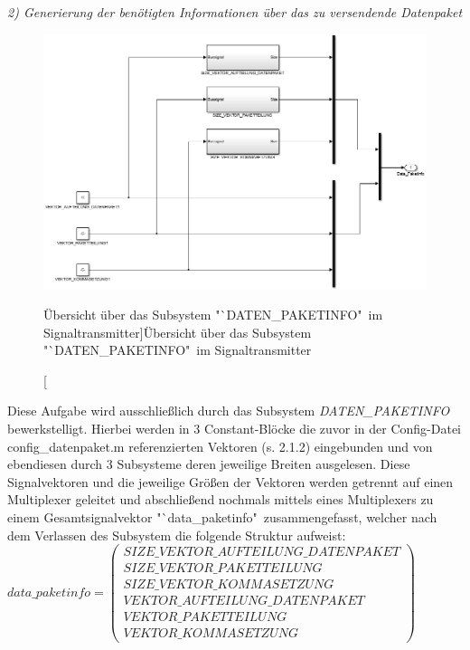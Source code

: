\documentclass[fontsize = 12pt, paper = a4]{scrreprt}
\begin{document}

\textit{2) Generierung der benötigten Informationen über das zu versendende Datenpaket} \\

\begin{figure}[h]
\centering
\includegraphics[scale = 0.6]{subdatenpaketinfo}
\caption[Übersicht über das Subsystem "`DATEN\_PAKETINFO"\ im Signaltransmitter]{Übersicht über das Subsystem "`DATEN\_PAKETINFO"\ im Signaltransmitter}
\label{subdatenpaketinfo}
\end{figure} 

\newpage

Diese Aufgabe wird ausschließlich durch das Subsystem \textit{DATEN\_PAKETINFO} bewerkstelligt. Hierbei werden in 3 Constant-Blöcke die zuvor in der Config-Datei config\_datenpaket.m referenzierten Vektoren (s. 2.1.2) eingebunden und von ebendiesen durch 3 Subsysteme deren jeweilige Breiten ausgelesen. Diese Signalvektoren und die jeweilige Größen der Vektoren werden getrennt auf einen Multiplexer geleitet und abschließend nochmals mittels eines Multiplexers zu einem Gesamtsignalvektor "`data\_paketinfo"\ zusammengefasst, welcher nach dem Verlassen des Subsystem die folgende Struktur aufweist: \\

$ data\_paketinfo = \left( \begin{array}{c} SIZE\_VEKTOR\_AUFTEILUNG\_DATENPAKET \\ SIZE\_VEKTOR\_PAKETTEILUNG \\ SIZE\_VEKTOR\_KOMMASETZUNG \\ VEKTOR\_AUFTEILUNG\_DATENPAKET \\ VEKTOR\_PAKETTEILUNG \\ VEKTOR\_KOMMASETZUNG  \end{array} \right)$ 
\end{document}
